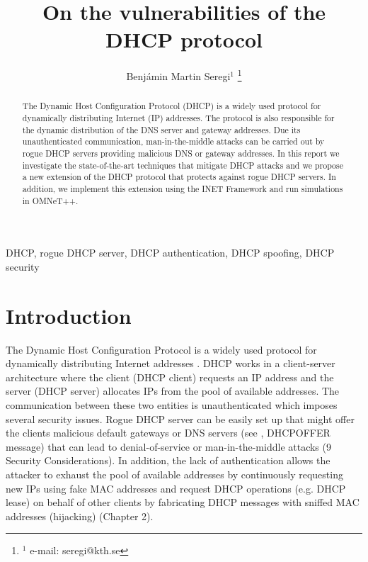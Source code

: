 \documentclass[letterpaper, 10 pt, conference]{ieeeconf}  %
\title{\LARGE \bf
On the vulnerabilities of the DHCP protocol
}
\author{Benjámin Martin Seregi$^{1}$%
\thanks{$^{1}$ e-mail: seregi@kth.se}%
}
\begin{document}
\maketitle
\thispagestyle{fancy}
\fancyhf{}

\begin{abstract}
The Dynamic Host Configuration Protocol (DHCP) is a widely used protocol for dynamically distributing Internet (IP) addresses. The protocol is also responsible for the dynamic distribution of the DNS server and gateway addresses. Due its unauthenticated communication, man-in-the-middle attacks can be carried out by rogue DHCP servers providing malicious DNS or gateway addresses. In this report we investigate the state-of-the-art techniques that mitigate DHCP attacks and we propose a new extension of the DHCP protocol that protects against rogue DHCP servers. In addition, we implement this extension using the INET Framework and run simulations in OMNeT++.
\end{abstract}

\begin{keywords}
DHCP, rogue DHCP server, DHCP authentication, DHCP spoofing, DHCP security
\end{keywords}

\section{Introduction}
The Dynamic Host Configuration Protocol is a widely used protocol for dynamically distributing Internet addresses \cite{dhcprfc}. DHCP works in a client-server architecture where the client (DHCP client) requests an IP address and the server (DHCP server) allocates IPs from the pool of available addresses. The communication between these two entities is unauthenticated \cite{dhcprfc} which imposes several security issues. Rogue DHCP server can be easily set up that might offer the clients malicious default gateways or DNS servers (see \cite{dhcprfc}, DHCPOFFER message) that can lead to denial-of-service or man-in-the-middle attacks \cite{Rooney:2010:IIA:1951974} (9 Security Considerations). In addition, the lack of authentication allows the attacker to exhaust the pool of available addresses by continuously requesting new IPs using fake MAC addresses and request DHCP operations (e.g. DHCP lease) on behalf of other clients by fabricating DHCP messages with sniffed MAC addresses (hijacking) \cite{practical-embedded-security} (Chapter 2).
\end{document}

